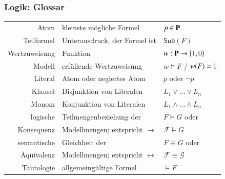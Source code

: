 \documentclass[aspectratio=1610,onlymath]{beamer}
\begin{document}
\maketitle

\begin{frame}\frametitle{Logik: Glossar}

\begin{tabular}{@{}rll@{}}
\rowcolor{darkblue!10}
Atom & kleinste mögliche Formel & $p\in\textbf{\textcolor{black}{P}}$\\
%
Teilformel & Unterausdruck, der Formel ist & $\textsf{Sub}(F)$ \\
%
\rowcolor{darkblue!10}
Wertzuweisung & Funktion & $w:\textbf{\textcolor{black}{P}}\to\{\textcolor{purple}{1},\textcolor{purple}{0}\}$\\
%
Modell & erfüllende Wertzuweisung & $w\models F$ / $w(F)=\textcolor{purple}{1}$\\
%
\rowcolor{darkblue!10}
Literal & Atom oder negiertes Atom & $p$ oder $\neg p$\\
%
Klausel & Disjunktion von Literalen & $L_1\vee\ldots\vee L_n$ \\
%
\rowcolor{darkblue!10}
Monom & Konjunktion von Literalen & $L_1\wedge\ldots\wedge L_n$ \\
%
logische & Teilmengenbeziehung der  & $F\models G$ oder \\[-0.8ex]
Konsequenz & Modellmengen; entspricht $\to$ &  $\mathcal{F}\models G$\\
%
\rowcolor{darkblue!10}
semantische & Gleichheit der  & $F\equiv G$ oder \\[-0.8ex]
\rowcolor{darkblue!10}
Äquivalenz & Modellmengen; entspricht $\leftrightarrow$ &  $\mathcal{F}\equiv\mathcal{G}$\\
%
Tautologie & allgemeingültige Formel & $\models F$

\end{tabular}

\end{frame}
\end{document}
